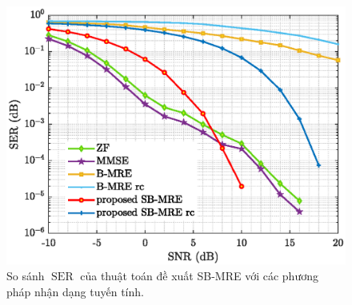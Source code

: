 \begin{figure}[ht]
    \centering
    \includegraphics[width=.8\linewidth]{figures/performance.eps}
    \caption{So sánh $\operatorname{SER}$ của thuật toán đề xuất SB-MRE với các phương pháp nhận dạng tuyến tính.}
    \label{fig:performance}
\end{figure}

